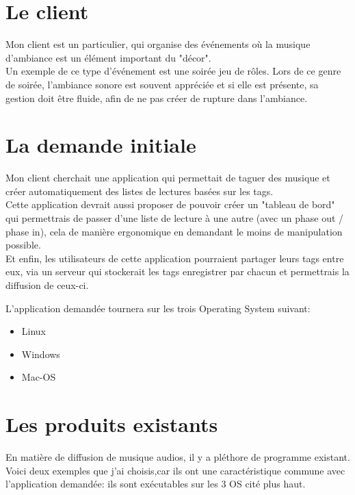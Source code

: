\documentclass[a4paper,12pt]{report}
\begin{document}
\section{Le client}

Mon client est un particulier, qui organise des événements où la musique d'ambiance est un élément important du "décor". \\

Un exemple de ce type d'événement est une soirée jeu de rôles.
Lors de ce genre de soirée, l'ambiance sonore est souvent appréciée et si elle est présente, sa gestion doit être fluide, afin de ne pas créer de rupture dans l'ambiance.

\section{La demande initiale}
Mon client cherchait une application qui permettait de taguer des musique et créer automatiquement des listes de lectures basées sur les tags.\\

Cette application devrait aussi proposer de pouvoir créer un "tableau de bord" qui permettrais de passer d'une liste de lecture à une autre (avec un phase out / phase in), cela de manière ergonomique en demandant le moins de manipulation possible.\\

Et enfin, les utilisateurs de cette application pourraient partager leurs tags entre eux, via un serveur qui stockerait les tags enregistrer par chacun et permettrais la diffusion de ceux-ci.

L'application demandée tournera sur les trois Operating System suivant:\\

\begin{itemize}
\item Linux
\item Windows
\item Mac-OS
\end{itemize}

\section{Les produits existants}

En matière de diffusion de musique audios, il y a pléthore de programme existant.
Voici deux exemples que j'ai choisis,car ils ont une caractéristique commune avec l'application demandée: ils sont exécutables sur les 3 OS cité plus haut. \\
\end{document}
